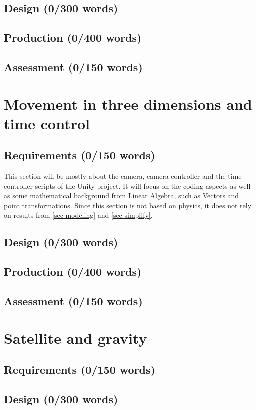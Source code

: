 \documentclass[conference,compsoc]{IEEEtran}
\begin{document}
\subsection{Design (0/300 words)}
\subsection{Production (0/400 words)}
\subsection{Assessment (0/150 words)}

\section{Movement in three dimensions and time control}
\label{sec-movement-in-3D}
\subsection{Requirements (0/150 words)}
This section will be mostly about the camera, camera controller and the time controller scripts of the Unity project. It will focus on the coding aspects as well as some mathematical background from Linear Algebra, such as Vectors and point transformations. Since this section is not based on physics, it does not rely on results from \ref{sec-modeling} and \ref{sec-simplify}.
\subsection{Design (0/300 words)}
\subsection{Production (0/400 words)}
\subsection{Assessment (0/150 words)}
\section{Satellite and gravity}
\label{sec-satellite-gravity}
\subsection{Requirements (0/150 words)}
\subsection{Design (0/300 words)}
\end{document}
